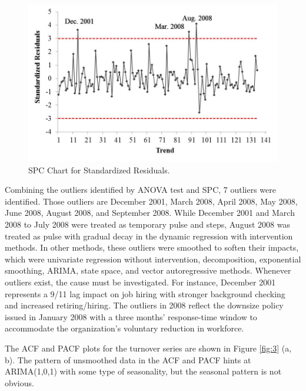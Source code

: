 \begin{figure}
	\centering
	\includegraphics[width=5in]{Fig2.jpg}
	\caption{SPC Chart for Standardized Residuals.}
	\label{fig:2}
\end{figure}Combining the outliers identified by ANOVA test and SPC, 7 outliers were identified. Those outliers are December 2001, March 2008, April 2008, May 2008, June 2008, August 2008, and September 2008. While December 2001 and March 2008 to July 2008 were treated as temporary pulse and steps, August 2008 was treated as pulse with gradual decay in the dynamic regression with intervention methods. In other methods, these outliers were smoothed to soften their impacts, which were univariate regression without intervention, decomposition, exponential smoothing, ARIMA, state space, and vector autoregressive methods. Whenever outliers exist, the cause must be investigated. For instance, December 2001 represents a 9/11 lag impact on job hiring with stronger background checking and increased retiring/hiring. The outliers in 2008 reflect the downsize policy issued in January 2008 with a three months' response-time window to accommodate the organization's voluntary reduction in workforce. 

The ACF and PACF plots for the turnover series are shown in Figure \ref{fig:3} (a, b). The pattern of unsmoothed data in the ACF and PACF hints at ARIMA(1,0,1) with some type of seasonality, but the seasonal pattern is not obvious.
